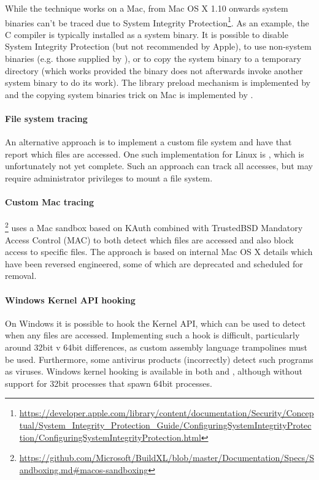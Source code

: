 While the technique works on a Mac, from Mac OS X 1.10 onwards system binaries can't be traced due to System Integrity Protection\footnote{\url{https://developer.apple.com/library/content/documentation/Security/Conceptual/System_Integrity_Protection_Guide/ConfiguringSystemIntegrityProtection/ConfiguringSystemIntegrityProtection.html}}. As an example, the C compiler is typically installed as a system binary. It is possible to disable System Integrity Protection (but not recommended by Apple), to use non-system binaries (e.g. those supplied by \Nix \cite{nix}), or to copy the system binary to a temporary directory (which works provided the binary does not afterwards invoke another system binary to do its work). The library preload mechanism is implemented by \Fsatrace \cite{fsatrace} and the copying system binaries trick on Mac is implemented by \Shake \cite{shake}.

\paragraph{File system tracing} An alternative approach is to implement a custom file system and have that report which files are accessed. One such implementation for Linux is \tracedfs \cite{tracedfs}, which is unfortunately not yet complete. Such an approach can track all accesses, but may require administrator privileges to mount a file system.

\paragraph{Custom Mac tracing} \BuildXL \cite{buildxl}\footnote{\url{https://github.com/Microsoft/BuildXL/blob/master/Documentation/Specs/Sandboxing.md\#macos-sandboxing}} uses a Mac sandbox based on KAuth combined with TrustedBSD Mandatory Access Control (MAC) to both detect which files are accessed and also block access to specific files. The approach is based on internal Mac OS X details which have been reversed engineered, some of which are deprecated and scheduled for removal.

\paragraph{Windows Kernel API hooking} On Windows it is possible to hook the Kernel API, which can be used to detect when any files are accessed. Implementing such a hook is difficult, particularly around 32bit v 64bit differences, as custom assembly language trampolines must be used. Furthermore, some antivirus products (incorrectly) detect such programs as viruses. Windows kernel hooking is available in both \Fsatrace and \Bigbro, although without support for 32bit processes that spawn 64bit processes.

